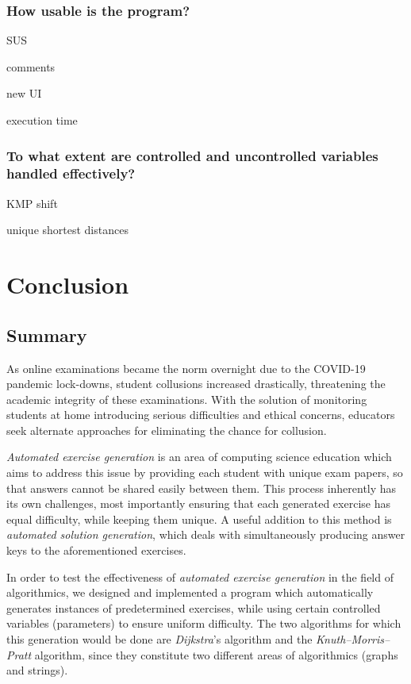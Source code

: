 \documentclass{l4proj}
\begin{document}
\subsection{How usable is the program?}

SUS

comments

new UI

execution time

\subsection{To what extent are controlled and uncontrolled variables handled effectively?}

KMP shift

unique shortest distances


\chapter{Conclusion}    
\section{Summary}

As online examinations became the norm overnight due to the COVID-19 pandemic lock-downs, student collusions increased drastically, threatening the academic integrity of these examinations. With the solution of monitoring students at home introducing serious difficulties and ethical concerns, educators seek alternate approaches for eliminating the chance for collusion.

\emph{Automated exercise generation} is an area of computing science education which aims to address this issue by providing each student with unique exam papers, so that answers cannot be shared easily between them. This process inherently has its own challenges, most importantly ensuring that each generated exercise has equal difficulty, while keeping them unique. A useful addition to this method is \emph{automated solution generation}, which deals with simultaneously producing answer keys to the aforementioned exercises.

In order to test the effectiveness of \emph{automated exercise generation} in the field of algorithmics, we designed and implemented a program which automatically generates instances of predetermined exercises, while using certain controlled variables (parameters) to ensure uniform difficulty. The two algorithms for which this generation would be done are \emph{Dijkstra}'s algorithm and the \emph{Knuth–Morris–Pratt} algorithm, since they constitute two different areas of algorithmics (graphs and strings).
\end{document}
